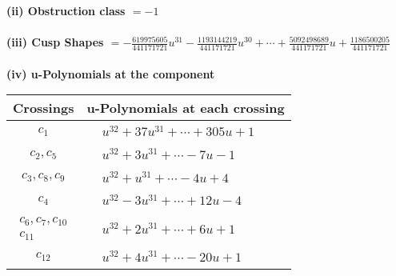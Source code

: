 \documentclass[1p]{elsarticle_modified}
\theoremstyle{definition}
\begin{document}
\flushleft \textbf{(ii) Obstruction class $= -1$}\\~\\
\flushleft \textbf{(iii) Cusp Shapes $= -\frac{619975605}{441171721} u^{31}-\frac{1193144219}{441171721} u^{30}+\cdots+\frac{5092498689}{441171721} u+\frac{1186500205}{441171721}$}\\~\\
\newpage\renewcommand{\arraystretch}{1}
\flushleft \textbf{(iv) u-Polynomials at the component}\newline \\
\begin{tabular}{m{50pt}|m{274pt}}
Crossings & \hspace{64pt}u-Polynomials at each crossing \\
\hline $$\begin{aligned}c_{1}\end{aligned}$$&$\begin{aligned}
&u^{32}+37 u^{31}+\cdots+305 u+1
\end{aligned}$\\
\hline $$\begin{aligned}c_{2},c_{5}\end{aligned}$$&$\begin{aligned}
&u^{32}+3 u^{31}+\cdots-7 u-1
\end{aligned}$\\
\hline $$\begin{aligned}c_{3},c_{8},c_{9}\end{aligned}$$&$\begin{aligned}
&u^{32}+u^{31}+\cdots-4 u+4
\end{aligned}$\\
\hline $$\begin{aligned}c_{4}\end{aligned}$$&$\begin{aligned}
&u^{32}-3 u^{31}+\cdots+12 u-4
\end{aligned}$\\
\hline $$\begin{aligned}c_{6},c_{7},c_{10}\\c_{11}\end{aligned}$$&$\begin{aligned}
&u^{32}+2 u^{31}+\cdots+6 u+1
\end{aligned}$\\
\hline $$\begin{aligned}c_{12}\end{aligned}$$&$\begin{aligned}
&u^{32}+4 u^{31}+\cdots-20 u+1
\end{aligned}$\\
\hline
\end{tabular}\\~\\
\end{document}
